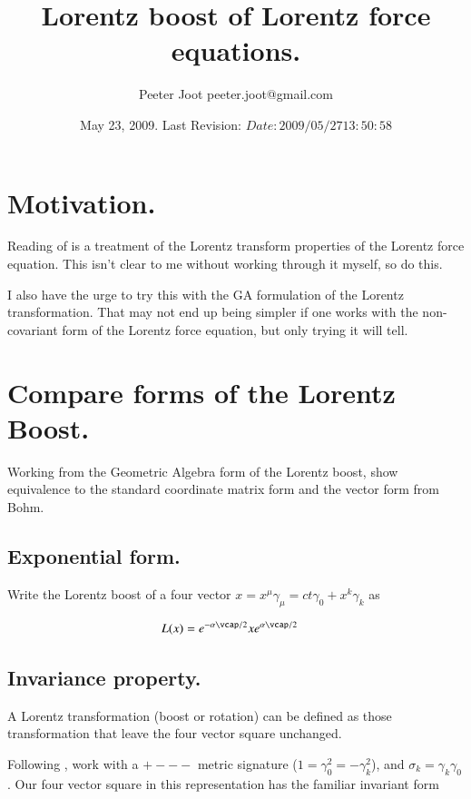 \documentclass{article}
\title{ Lorentz boost of Lorentz force equations. }
\author{Peeter Joot \quad peeter.joot@gmail.com }
\date{ May 23, 2009.  Last Revision: $Date: 2009/05/27 13:50:58 $ }
\begin{document}
\maketitle{}
\tableofcontents
\section{ Motivation. }

Reading of \cite{bohm1996str} is a treatment of the Lorentz transform
properties of the Lorentz force equation.  This isn't clear to me
without working through it myself, so do this.

I also have the urge to 
try this with the GA formulation of the Lorentz transformation.  That may not end up being simpler
if one works with the non-covariant form of the Lorentz force equation, but only trying it will tell.

\section{ Compare forms of the Lorentz Boost. }

Working from the Geometric Algebra form of the Lorentz boost, show equivalence to the standard
coordinate matrix form and the vector form from Bohm.

\subsection{ Exponential form. }

Write the Lorentz boost of a four vector $x = x^\mu \gamma_\mu = ct \gamma_0 + x^k \gamma_k$ as

\begin{align}\label{eqn:LorentzBoost}
L(x) &= 
e^{-\alpha \vcap/2}
x
e^{\alpha \vcap/2}
\end{align}

\subsection{ Invariance property. }

A Lorentz transformation (boost or rotation) can be defined as those transformation that leave the four vector square unchanged.

Following \cite{doran2003gap}, work with a $+---$ metric signature ($1 = \gamma_0^2 = -\gamma_k^2$), and $\sigma_k = \gamma_k \gamma_0$.  Our four vector square in this representation has the familiar invariant form
\end{document}
